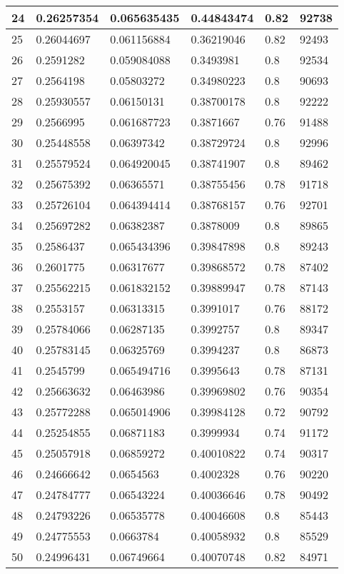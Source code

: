 \begin{longtable}{|l|l|l|l|l|l|}
24 & 0.26257354 & 0.065635435 & 0.44843474 & 0.82 & 92738 \\ \hline 
25 & 0.26044697 & 0.061156884 & 0.36219046 & 0.82 & 92493 \\ \hline 
26 & 0.2591282 & 0.059084088 & 0.3493981 & 0.8 & 92534 \\ \hline 
27 & 0.2564198 & 0.05803272 & 0.34980223 & 0.8 & 90693 \\ \hline 
28 & 0.25930557 & 0.06150131 & 0.38700178 & 0.8 & 92222 \\ \hline 
29 & 0.2566995 & 0.061687723 & 0.3871667 & 0.76 & 91488 \\ \hline 
30 & 0.25448558 & 0.06397342 & 0.38729724 & 0.8 & 92996 \\ \hline 
31 & 0.25579524 & 0.064920045 & 0.38741907 & 0.8 & 89462 \\ \hline 
32 & 0.25675392 & 0.06365571 & 0.38755456 & 0.78 & 91718 \\ \hline 
33 & 0.25726104 & 0.064394414 & 0.38768157 & 0.76 & 92701 \\ \hline 
34 & 0.25697282 & 0.06382387 & 0.3878009 & 0.8 & 89865 \\ \hline 
35 & 0.2586437 & 0.065434396 & 0.39847898 & 0.8 & 89243 \\ \hline 
36 & 0.2601775 & 0.06317677 & 0.39868572 & 0.78 & 87402 \\ \hline 
37 & 0.25562215 & 0.061832152 & 0.39889947 & 0.78 & 87143 \\ \hline 
38 & 0.2553157 & 0.06313315 & 0.3991017 & 0.76 & 88172 \\ \hline 
39 & 0.25784066 & 0.06287135 & 0.3992757 & 0.8 & 89347 \\ \hline 
40 & 0.25783145 & 0.06325769 & 0.3994237 & 0.8 & 86873 \\ \hline 
41 & 0.2545799 & 0.065494716 & 0.3995643 & 0.78 & 87131 \\ \hline 
42 & 0.25663632 & 0.06463986 & 0.39969802 & 0.76 & 90354 \\ \hline 
43 & 0.25772288 & 0.065014906 & 0.39984128 & 0.72 & 90792 \\ \hline 
44 & 0.25254855 & 0.06871183 & 0.3999934 & 0.74 & 91172 \\ \hline 
45 & 0.25057918 & 0.06859272 & 0.40010822 & 0.74 & 90317 \\ \hline 
46 & 0.24666642 & 0.0654563 & 0.4002328 & 0.76 & 90220 \\ \hline 
47 & 0.24784777 & 0.06543224 & 0.40036646 & 0.78 & 90492 \\ \hline 
48 & 0.24793226 & 0.06535778 & 0.40046608 & 0.8 & 85443 \\ \hline 
49 & 0.24775553 & 0.0663784 & 0.40058932 & 0.8 & 85529 \\ \hline 
50 & 0.24996431 & 0.06749664 & 0.40070748 & 0.82 & 84971 \\ \hline 
\end{longtable}